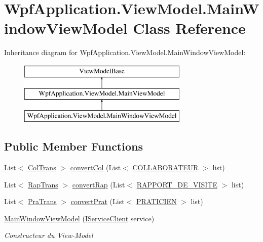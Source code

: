 \hypertarget{class_wpf_application_1_1_view_model_1_1_main_window_view_model}{\section{Wpf\-Application.\-View\-Model.\-Main\-Window\-View\-Model Class Reference}
\label{class_wpf_application_1_1_view_model_1_1_main_window_view_model}
}
Inheritance diagram for Wpf\-Application.\-View\-Model.\-Main\-Window\-View\-Model\-:\begin{figure}[H]
\begin{center}
\leavevmode
\includegraphics[height=3.000000cm]{class_wpf_application_1_1_view_model_1_1_main_window_view_model}
\end{center}
\end{figure}
\subsection*{Public Member Functions}
\begin{DoxyCompactItemize}
\item 
List$<$ \hyperlink{class_wpf_application_1_1_view_model_1_1_trans_1_1_col_trans}{Col\-Trans} $>$ \hyperlink{class_wpf_application_1_1_view_model_1_1_main_window_view_model_a6063564818bfdec1fbe87e6f0d3a91e1}{convert\-Col} (List$<$ \hyperlink{class_model_1_1_c_o_l_l_a_b_o_r_a_t_e_u_r}{C\-O\-L\-L\-A\-B\-O\-R\-A\-T\-E\-U\-R} $>$ list)
\item 
List$<$ \hyperlink{class_wpf_application_1_1_view_model_1_1_trans_1_1_rap_trans}{Rap\-Trans} $>$ \hyperlink{class_wpf_application_1_1_view_model_1_1_main_window_view_model_a8918e291a784522e1b3b39e2eb155696}{convert\-Rap} (List$<$ \hyperlink{class_model_1_1_r_a_p_p_o_r_t___d_e___v_i_s_i_t_e}{R\-A\-P\-P\-O\-R\-T\-\_\-\-D\-E\-\_\-\-V\-I\-S\-I\-T\-E} $>$ list)
\item 
List$<$ \hyperlink{class_wpf_application_1_1_view_model_1_1_trans_1_1_pra_trans}{Pra\-Trans} $>$ \hyperlink{class_wpf_application_1_1_view_model_1_1_main_window_view_model_aef1459769387db166cd60362723652e6}{convert\-Prat} (List$<$ \hyperlink{class_model_1_1_p_r_a_t_i_c_i_e_n}{P\-R\-A\-T\-I\-C\-I\-E\-N} $>$ list)
\item 
\hyperlink{class_wpf_application_1_1_view_model_1_1_main_window_view_model_a7ac6f627260aea5f5449c034bd73eb38}{Main\-Window\-View\-Model} (\hyperlink{interface_wpf_application_1_1_model_1_1_i_service_client}{I\-Service\-Client} service)
\begin{DoxyCompactList}\small\item\em Constructeur du View-\/\-Model \end{DoxyCompactList}\end{DoxyCompactItemize}
